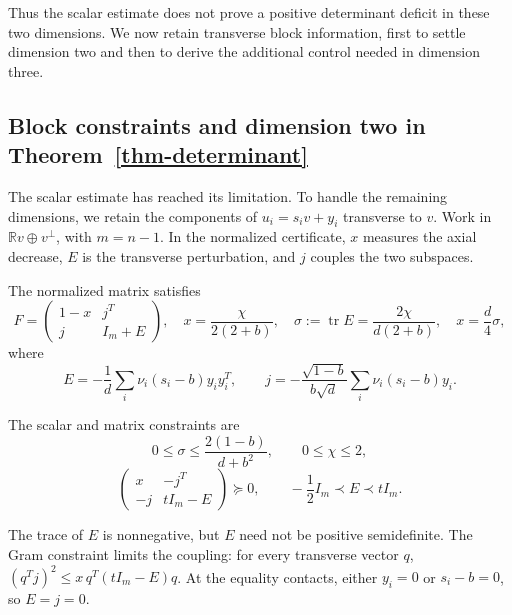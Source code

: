 Thus the scalar estimate does not prove a positive determinant deficit in these
two dimensions. We now retain transverse block information, first to settle
dimension two and then to derive the additional control needed in dimension three.

\subsection{Block constraints and dimension two in Theorem~\ref{thm-determinant}}\label{sec:8.3}

The scalar estimate has reached its limitation. To handle the remaining
dimensions, we retain the components of $u_i=s_iv+y_i$ transverse to $v$.
Work in $\mathbb Rv\oplus v^\perp$, with $m=n-1$.
In the normalized certificate, $x$ measures the axial decrease, $E$ is the
transverse perturbation, and $j$ couples the two subspaces.

\begin{lemma}\label{lem-moments}
The normalized matrix satisfies
\begin{equation}\label{eq:8.40}
\widehat F=\begin{pmatrix}1-x&j^T\\j&I_m+E\end{pmatrix},
\quad x=\frac{\chi}{2(2+b)},\quad
\sigma:=\operatorname{tr}E=\frac{2\chi}{d(2+b)},\quad x=\frac d4\sigma,
\end{equation}
where
\begin{equation}\label{eq:8.41}
E=-\frac1d\sum_i\nu_i(s_i-b)y_i y_i^T,
\qquad
j=-\frac{\sqrt{1-b}}{b\sqrt d}\sum_i\nu_i(s_i-b)y_i.
\end{equation}

The scalar and matrix constraints are
\begin{equation}\label{eq:8.42}
0\le\sigma\le\frac{2(1-b)}{d+b^2},\qquad 0\le\chi\le2,
\end{equation}
\begin{equation}\label{eq:8.43}
\begin{pmatrix}x&-j^T\\-j&tI_m-E\end{pmatrix}\succeq0,
\qquad -\frac12I_m\prec E\prec tI_m.
\end{equation}

\end{lemma}

The trace of $E$ is nonnegative, but $E$ need not be positive semidefinite.
The Gram constraint limits the coupling: for every transverse vector $q$,
$(q^Tj)^2\le x\,q^T(tI_m-E)q$. At the equality contacts, either $y_i=0$
or $s_i-b=0$, so $E=j=0$.


